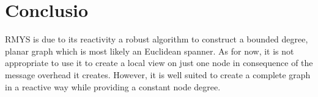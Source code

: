 \section{Conclusio}
RMYS is due to its reactivity a robust algorithm to construct a bounded degree, planar graph which is most likely an Euclidean spanner.
As for now, it is not appropriate to use it to create a local view on just one node in consequence of the message overhead it creates.
However, it is well suited to create a complete graph in a reactive way while providing a constant node degree.
